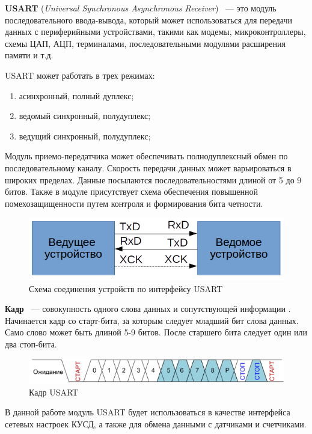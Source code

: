 \textbf{USART} (\textit{Universal Synchronous Asynchronous Receiver}) ~--- это модуль последовательного ввода-вывода, который может использоваться для передачи данных с периферийными устройствами, такими как модемы, микроконтроллеры, схемы ЦАП, АЦП, терминалами, последовательными модулями расширения памяти и т.д. \cite{usart1}

USART может работать в трех режимах:
\begin{enumerate}
\item асинхронный, полный дуплекс;
\item ведомый синхронный, полудуплекс;
\item ведущий синхронный, полудуплекс;
\end{enumerate}

Модуль приемо-передатчика может обеспечивать полнодуплексный обмен по последовательному каналу. Скорость передачи данных может варьироваться в широких пределах. Данные посылаются последовательностями длиной от 5 до 9 битов. Также в модуле присутствует схема обеспечения повышенной помехозащищенности путем контроля и формирования бита четности.

\begin{figure}[H]
	\label{usartscheme}
	\centering
		\includegraphics[scale=0.8]{img/usartscheme.png}
	\caption{Схема соединения устройств по интерфейсу USART}
\end{figure}

\textbf{Кадр} ~--- совокупность одного слова данных и сопутствующей информации \cite{usart1}. Начинается кадр со старт-бита, за которым следует младший бит слова данных. Само слово может быть длиной 5-9 битов. После 
старшего бита следует один или два стоп-бита.

\begin{figure}[H]
	\label{usartframe}
	\centering
		\includegraphics[scale=0.8]{img/usartframe.png}
	\caption{Кадр USART\cite{usart1}}
\end{figure}

В данной работе модуль USART будет использоваться в качестве интерфейса сетевых настроек КУСД, а также для обмена данными с датчиками и счетчиками.

